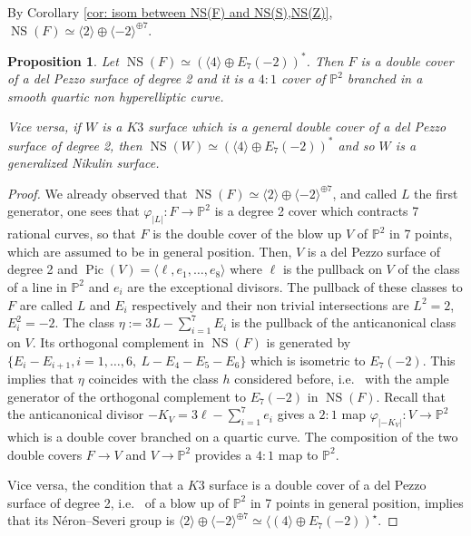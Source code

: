 \documentclass{amsart}
\newtheorem{prop}[thm]{Proposition}
\theoremstyle{definition}
\numberwithin{equation}{section}
\numberwithin{equation}{section} \theoremstyle{definition}
\DeclareMathOperator{\Pic}{Pic}
\DeclareMathOperator{\NS}{NS}
\newcommand{\ra}{\rightarrow}
\begin{document}
By Corollary \ref{cor: isom between NS(F) and NS(S),NS(Z)}, $\NS(F)\simeq \langle 2\rangle\oplus \langle -2\rangle^{\oplus 7}$.
\begin{prop}\label{prop: double cover dP2} Let $\NS(F)\simeq (\langle 4\rangle\oplus E_7(-2))^*$. Then $F$ is a double cover of a del Pezzo surface of degree 2 and it is a $4:1$ cover of $\mathbb{P}^2$ branched in a smooth quartic non hyperelliptic curve.

Vice versa, if $W$ is a $K3$ surface which is a general double cover of a del Pezzo surface of degree 2, then $\NS(W)\simeq (\langle 4\rangle\oplus E_7(-2))^*$ and so $W$ is a generalized Nikulin surface.
\end{prop}
\begin{proof} We already observed that $\NS(F)\simeq \langle 2\rangle\oplus \langle -2\rangle^{\oplus 7}$, and called $L$ the first generator, one sees that $\varphi_{|L|}:F\ra\mathbb{P}^2$ is a degree 2 cover which contracts 7 rational curves, so that $F$ is the double cover of the blow up $V$ of $\mathbb{P}^2$ in 7 points, which are assumed to be in general position. Then, $V$ is a del Pezzo surface of degree 2 and $\Pic(V)=\langle \ell, e_1,\ldots , e_8\rangle$ where $\ell$ is the pullback on $V$ of the class of a line in $\mathbb{P}^2$ and $e_i$ are the exceptional divisors. The pullback of these classes to $F$ are called $L$ and $E_i$ respectively and their non trivial intersections are $L^2=2$, $E_i^2=-2$. The class $\eta:=3L-\sum_{i=1}^7E_i$ is the pullback of the anticanonical class on $V$.  Its orthogonal complement in $\NS(F)$ is generated by $\{E_i-E_{i+1},i=1,\ldots,6,\  L-E_4-E_5-E_6\}$ which is isometric to $E_7(-2)$. This implies that $\eta$ coincides with the class $h$ considered before, i.e.~ with the ample generator of the orthogonal complement to $E_7(-2)$ in $\NS(F)$. 
Recall that the anticanonical divisor $-K_V=3\ell-\sum_{i=1}^7e_i$ gives a $2:1$ map $\varphi_{|-K_V|}:V\ra\mathbb{P}^2$ which is a double cover branched on a quartic curve. The composition of the two double covers $F\ra V$ and $V\ra \mathbb{P}^2$ provides a $4:1$ map to $\mathbb{P}^2$. 

Vice versa, the condition that a $K3$ surface is a double cover of a del Pezzo surface of degree 2, i.e.~ of a blow up of $\mathbb{P}^2$ in 7 points in general position, implies that its N\'eron--Severi group is $\langle 2\rangle\oplus \langle -2\rangle^{\oplus 7}\simeq \langle \left(4\rangle\oplus E_7(-2)\right)^{\star}$.\end{proof}
\end{document}
